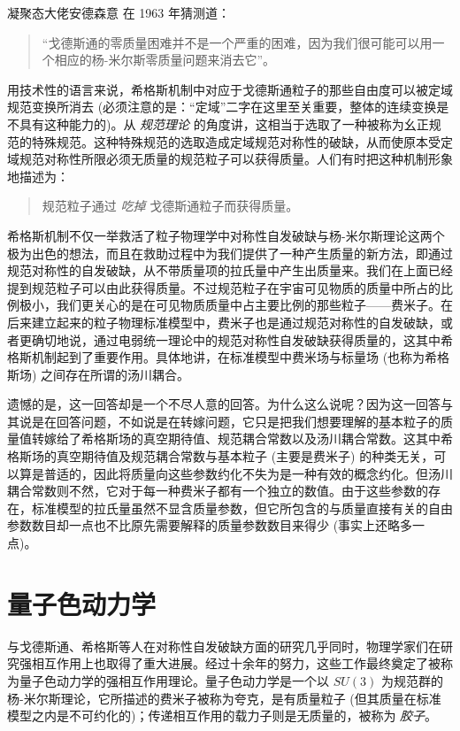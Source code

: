 \documentclass[oneside,a4paper,openany,11pt]{ctexbook}
\begin{document}

凝聚态大佬安德森意 在 1963 年猜测道：

\begin{quote}
    “戈德斯通的零质量困难并不是一个严重的困难，因为我们很可能可以用一个相应的杨-米尔斯零质量问题来消去它”。
\end{quote}

用技术性的语言来说，希格斯机制中对应于戈德斯通粒子的那些自由度可以被定域规范变换所消去 (必须注意的是：“定域”二字在这里至关重要，整体的连续变换是不具有这种能力的)。从 \emph{规范理论} 的角度讲，这相当于选取了一种被称为幺正规范的特殊规范。这种特殊规范的选取造成定域规范对称性的破缺，从而使原本受定域规范对称性所限必须无质量的规范粒子可以获得质量。人们有时把这种机制形象地描述为：

\begin{quote}
    规范粒子通过 \emph{吃掉} 戈德斯通粒子而获得质量。
\end{quote}

希格斯机制不仅一举救活了粒子物理学中对称性自发破缺与杨-米尔斯理论这两个极为出色的想法，而且在救助过程中为我们提供了一种产生质量的新方法，即通过规范对称性的自发破缺，从不带质量项的拉氏量中产生出质量来。我们在上面已经提到规范粒子可以由此获得质量。不过规范粒子在宇宙可见物质的质量中所占的比例极小，我们更关心的是在可见物质质量中占主要比例的那些粒子——费米子。在后来建立起来的粒子物理标准模型中，费米子也是通过规范对称性的自发破缺，或者更确切地说，通过电弱统一理论中的规范对称性自发破缺获得质量的，这其中希格斯机制起到了重要作用。具体地讲，在标准模型中费米场与标量场 (也称为希格斯场) 之间存在所谓的汤川耦合。

遗憾的是，这一回答却是一个不尽人意的回答。为什么这么说呢？因为这一回答与其说是在回答问题，不如说是在转嫁问题，它只是把我们想要理解的基本粒子的质量值转嫁给了希格斯场的真空期待值、规范耦合常数以及汤川耦合常数。这其中希格斯场的真空期待值及规范耦合常数与基本粒子 (主要是费米子) 的种类无关，可以算是普适的，因此将质量向这些参数约化不失为是一种有效的概念约化。但汤川耦合常数则不然，它对于每一种费米子都有一个独立的数值。由于这些参数的存在，标准模型的拉氏量虽然不显含质量参数，但它所包含的与质量直接有关的自由参数数目却一点也不比原先需要解释的质量参数数目来得少 (事实上还略多一点)。

\section{量子色动力学}

与戈德斯通、希格斯等人在对称性自发破缺方面的研究几乎同时，物理学家们在研究强相互作用上也取得了重大进展。经过十余年的努力，这些工作最终奠定了被称为量子色动力学的强相互作用理论。量子色动力学是一个以 $SU(3)$ 为规范群的杨-米尔斯理论，它所描述的费米子被称为夸克，是有质量粒子 (但其质量在标准模型之内是不可约化的)；传递相互作用的载力子则是无质量的，被称为 \emph{胶子}。
\end{document}

